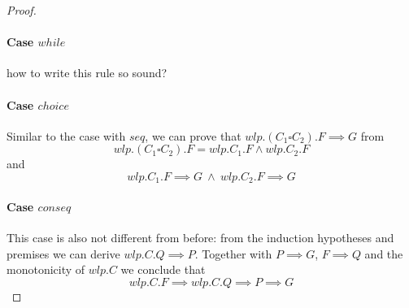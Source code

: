 \begin{proof}
	\paragraph{Case $while$}
	\colorbox{red!30}{
		how to write this rule so sound? 
	}%
	\paragraph{Case $choice$} Similar to the case with $seq$, we can prove that $wlp.(C_1\square C_2).F \implies G$ from 
	$$wlp.(C_1\square C_2).F = wlp.C_1.F \wedge wlp.C_2.F$$
	and 
	$$wlp.C_1.F \implies G\ \wedge\ wlp.C_2.F \implies G$$

	\paragraph{Case $conseq$}
	This case is also not different from before: from the induction hypotheses and premises we can derive $wlp.C.Q \implies P$. 
	Together with $P\implies G$, $F\implies Q$ and the monotonicity of $wlp.C$ we conclude that 
	$$wlp.C.F\implies wlp.C.Q \implies P \implies G$$
\end{proof}
